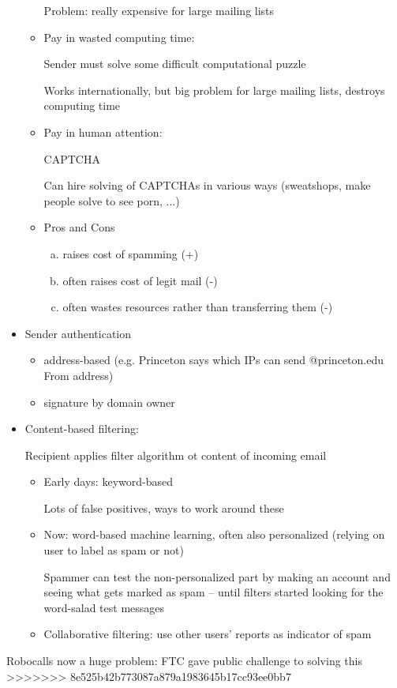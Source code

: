 \begin{itemize}
\begin{itemize}
                Problem: really expensive for large mailing lists
            \item Pay in wasted computing time:

                Sender must solve some difficult computational puzzle

                Works internationally, but big problem for large mailing lists,
                destroys computing time
            \item Pay in human attention:

                CAPTCHA %

                Can hire solving of CAPTCHAs in various ways (sweatshops, make
                    people solve to see porn, ...)
                 
             \item Pros and Cons
                		 \begin{enumerate}[(a)]
  			 \item raises cost of spamming (+)
  			 \item often raises cost of legit mail (-)
  			 \item often wastes resources rather than transferring them (-)
			\end{enumerate}
        \end{itemize}
    \item Sender authentication
    	\begin{itemize}
			\item address-based (e.g. Princeton says which IPs can send @princeton.edu From address)
			\item signature by domain owner
	\end{itemize}
    \item Content-based filtering:

        Recipient applies filter algorithm ot content of incoming email
        \begin{itemize}
            \item Early days: keyword-based

                Lots of false positives, ways to work around these
            \item Now: word-based machine learning, often also personalized
                (relying on user to label as spam or not)

                Spammer can test the non-personalized part by making an account
                and seeing what gets marked as spam -- until filters started
                looking for the word-salad test messages
            \item Collaborative filtering: use other users' reports as indicator
                of spam
        \end{itemize}
\end{itemize}

Robocalls now a huge problem: FTC gave public challenge to solving this
>>>>>>> 8e525b42b773087a879a1983645b17cc93ee0bb7
